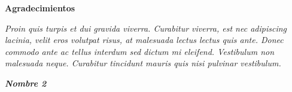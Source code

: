 
\begin{center}

\textbf{}

\vspace{3cm}

\Large{\textbf{Agradecimientos\\}}

\vspace{2cm}

 \normalsize{
 \textit{
Proin quis turpis et dui gravida viverra. Curabitur viverra, est nec adipiscing lacinia, velit eros volutpat risus, at malesuada lectus lectus quis ante. Donec commodo ante ac tellus interdum sed dictum mi eleifend. Vestibulum non malesuada neque. Curabitur tincidunt mauris quis nisi pulvinar vestibulum.
 }
}

\end{center}

\vspace{3cm}

\begin{flushright}

\textit{\textbf{Nombre 2}}

\end{flushright}

\pagestyle{empty}


